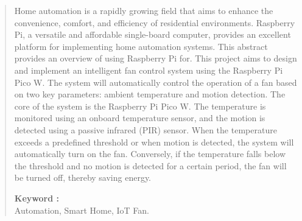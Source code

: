 \documentclass[12pt]{report}
\begin{document}
	
	\begin{quote}
		
		\hspace{1cm}Home automation is a rapidly growing field that aims to enhance the convenience, comfort, and efficiency of residential environments. Raspberry Pi, a versatile and affordable single-board computer, provides an excellent platform for implementing home automation systems. This abstract provides an overview of using Raspberry Pi for.  This project aims to design and implement an intelligent fan control system using the Raspberry Pi Pico W. The system will automatically control the operation of a fan based on two key parameters: ambient temperature and motion detection. The core of the system is the Raspberry Pi Pico W. The temperature is monitored using an onboard temperature sensor, and the motion is detected using a passive infrared (PIR) sensor. When the temperature exceeds a predefined threshold or when motion is detected, the system will automatically turn on the fan. Conversely, if the temperature falls below the threshold and no motion is detected for a certain period, the fan will be turned off, thereby saving energy.
		
		\textbf{Keyword :}\\[1ex]
		Automation, Smart Home, IoT Fan.
		
		
		
		
		
	\end{quote}
	\clearpage
	\tableofcontents
	\newpage
	
\end{document}

